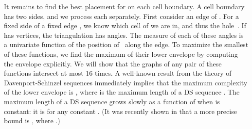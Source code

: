 \documentclass{cccg13}
\begin{document}
It remains to find the best placement for  on each cell boundary.  A cell boundary has two sides, and we process each separately.  First consider an edge of .  For a fixed side of a fixed edge , we know which cell of  we are in, and thus the hole~.  If  has  vertices, the triangulation has  angles.  The measure of each of these angles is a univariate function of the position of~ along the edge.  To maximize the smallest of these functions, we find the maximum of their lower envelope by computing the envelope explicitly.  We will show that the graphs of any pair of these functions intersect at most 16 times.  A well-known result from the theory of Davenport-Schinzel sequences immediately implies that the maximum complexity  of the lower envelope is , where  is the maximum length of a DS sequence \cite[section 1.2]{ds}.  The maximum length of a DS sequence grows slowly as a function of  when  is constant: it is  for any constant .  (It was recently shown in \cite{tight} that a more precise bound is , where .)
\end{document}
